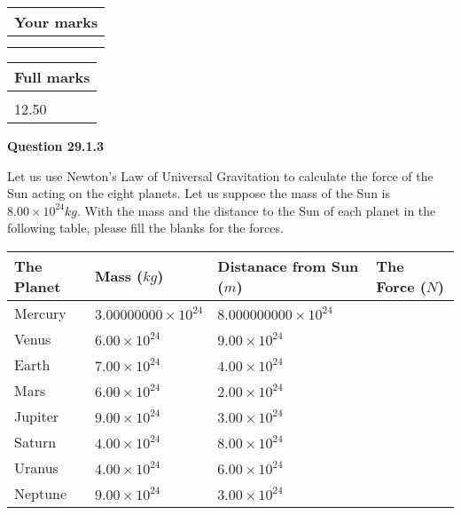 \documentclass[12pt]{article}
\begin{document}
 

 
\vspace{0.3in}
  
\vspace{0.2in}
  
         \begin{tabular}{|l|}
\hline
 Your marks  \\
\hline
 \\ 
 \\ 
\hline
\end{tabular}
\hspace{0.05in} \begin{tabular}{|l|}
\hline
 Full marks  \\
\hline
 \\ 
12.50 \\
\hline
\end{tabular}
{\textbf{\Large{Question
29.1.3 
}}}
  
  
Let us use Newton's Law of Universal Gravitation to calculate the force
of the Sun acting on the eight planets. Let us suppose the mass of the
Sun is $ %
8.00 \times 10^{24} kg$. With the mass and the
distance to the Sun of each planet in the following table, please fill
the blanks for the forces.
 
\vspace{0.2in}
 
 
\begin{tabular}{|l|l|l|l|}
\hline
The Planet & Mass ($kg$) & Distanace from Sun ($m$) & The Force ($N$)\\
\hline
Mercury  &
           $ %
3.00000000 \times 10^{24} $   &
             $ %
8.000000000 \times 10^{24} $    &
\\  \hline
Venus    &
           $ %
6.00 \times 10^{24} $    &
             $ %
9.00 \times 10^{24} $    &
\\  \hline
Earth    &
           $ %
7.00 \times 10^{24} $    &
             $ %
4.00 \times 10^{24} $    &
\\   \hline
Mars     &
           $ %
6.00 \times 10^{24} $    &
             $ %
2.00 \times 10^{24} $    &
\\   \hline
Jupiter  &
           $ %
9.00 \times 10^{24} $    &
             $ %
3.00 \times 10^{24} $    &
\\  \hline
Saturn   &
           $ %
4.00 \times 10^{24}$    &
             $ %
8.00 \times 10^{24}$    &
\\  \hline
Uranus   &
           $ %
4.00 \times 10^{24} $    &
             $ %
6.00 \times 10^{24} $    &
\\  \hline
Neptune  &
           $ %
9.00 \times 10^{24} $    &
             $ %
3.00 \times 10^{24} $    &
\\  \hline
 
\end{tabular}
 
\end{document}
